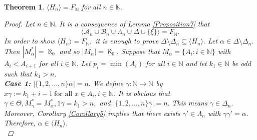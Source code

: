 \documentclass[11pt]{article}
\theoremstyle{plain}
\newtheorem{theorem}{Theorem}[section]
\theoremstyle{definition}
\begin{document}
\begin{theorem}\label{Proposition8}
$\langle H_{n}\rangle=F_{\mathbb{N}}$ for all $n\in\mathbb{N}.$
\begin{proof}
Let $n\in\mathbb{N}.$ It is a consequence of Lemma \ref{Proposition7} that $$\langle\mathcal{A}_{n}\cup\mathcal{B}_{n}\cup\Lambda_{n}\cup\Delta\cup\{\xi\}\rangle=F_{\mathbb{N}}.$$ In order to show $\langle H_{n}\rangle=F_{\mathbb{N}},$ it is enough to prove $\Delta\setminus\Delta_{n}\subseteq \langle H_{n}\rangle.$ Let $\alpha\in\Delta\setminus\Delta_{n}.$ Then $\left\vert M_{\alpha}^{*}\right\vert=\aleph_{0}$ and so $\left\vert M_{\alpha}\right\vert=\aleph_{0}.$ Suppose that $M_{\alpha}=\{A_{i}:i\in\mathbb{N}\}$ with $A_{i}<A_{i+1}$ for all $i\in\mathbb{N}.$ Let $p_{i}=\min(A_{i})$ for all $i\in\mathbb{N}$ and let $k_{1}\in\mathbb{N}$ be odd such that $k_{1}>n.$\\ 

\noindent\textbf{Case 1:} $\left\vert\{1,2,\ldots,n\}\alpha\right\vert=n.$ We define $\gamma:\mathbb{N}\to\mathbb{N}$ by $x\gamma:=k_{1}+i-1~\text{for all }x\in A_{i}, i\in\mathbb{N}.$ It is obvious that $\gamma\in\Theta, M_{\gamma}^{*}=M_{\alpha}^{*},1\gamma=k_{1}>n,$ and $\left\vert\{1,2,\ldots,n\}\gamma\right\vert=n.$ This means $\gamma\in\Delta_{n}.$ Moreover, Corollary \ref{Corollary5} implies that there exists $\gamma'\in\Lambda_{n}$ with $\gamma\gamma'=\alpha.$ Therefore, $\alpha\in\langle H_{n}\rangle.$\\


\end{proof}
\end{theorem}
\end{document}
